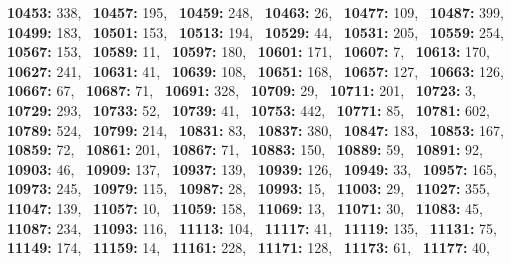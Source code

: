 \textbf{10453:} 338,\allowbreak~ 
\textbf{10457:} 195,\allowbreak~ 
\textbf{10459:} 248,\allowbreak~ 
\textbf{10463:} 26,\allowbreak~ 
\textbf{10477:} 109,\allowbreak~ 
\textbf{10487:} 399,\allowbreak~ 
\textbf{10499:} 183,\allowbreak~ 
\textbf{10501:} 153,\allowbreak~ 
\textbf{10513:} 194,\allowbreak~ 
\textbf{10529:} 44,\allowbreak~ 
\textbf{10531:} 205,\allowbreak~ 
\textbf{10559:} 254,\allowbreak~ 
\textbf{10567:} 153,\allowbreak~ 
\textbf{10589:} 11,\allowbreak~ 
\textbf{10597:} 180,\allowbreak~ 
\textbf{10601:} 171,\allowbreak~ 
\textbf{10607:} 7,\allowbreak~ 
\textbf{10613:} 170,\allowbreak~ 
\textbf{10627:} 241,\allowbreak~ 
\textbf{10631:} 41,\allowbreak~ 
\textbf{10639:} 108,\allowbreak~ 
\textbf{10651:} 168,\allowbreak~ 
\textbf{10657:} 127,\allowbreak~ 
\textbf{10663:} 126,\allowbreak~ 
\textbf{10667:} 67,\allowbreak~ 
\textbf{10687:} 71,\allowbreak~ 
\textbf{10691:} 328,\allowbreak~ 
\textbf{10709:} 29,\allowbreak~ 
\textbf{10711:} 201,\allowbreak~ 
\textbf{10723:} 3,\allowbreak~ 
\textbf{10729:} 293,\allowbreak~ 
\textbf{10733:} 52,\allowbreak~ 
\textbf{10739:} 41,\allowbreak~ 
\textbf{10753:} 442,\allowbreak~ 
\textbf{10771:} 85,\allowbreak~ 
\textbf{10781:} 602,\allowbreak~ 
\textbf{10789:} 524,\allowbreak~ 
\textbf{10799:} 214,\allowbreak~ 
\textbf{10831:} 83,\allowbreak~ 
\textbf{10837:} 380,\allowbreak~ 
\textbf{10847:} 183,\allowbreak~ 
\textbf{10853:} 167,\allowbreak~ 
\textbf{10859:} 72,\allowbreak~ 
\textbf{10861:} 201,\allowbreak~ 
\textbf{10867:} 71,\allowbreak~ 
\textbf{10883:} 150,\allowbreak~ 
\textbf{10889:} 59,\allowbreak~ 
\textbf{10891:} 92,\allowbreak~ 
\textbf{10903:} 46,\allowbreak~ 
\textbf{10909:} 137,\allowbreak~ 
\textbf{10937:} 139,\allowbreak~ 
\textbf{10939:} 126,\allowbreak~ 
\textbf{10949:} 33,\allowbreak~ 
\textbf{10957:} 165,\allowbreak~ 
\textbf{10973:} 245,\allowbreak~ 
\textbf{10979:} 115,\allowbreak~ 
\textbf{10987:} 28,\allowbreak~ 
\textbf{10993:} 15,\allowbreak~ 
\textbf{11003:} 29,\allowbreak~ 
\textbf{11027:} 355,\allowbreak~ 
\textbf{11047:} 139,\allowbreak~ 
\textbf{11057:} 10,\allowbreak~ 
\textbf{11059:} 158,\allowbreak~ 
\textbf{11069:} 13,\allowbreak~ 
\textbf{11071:} 30,\allowbreak~ 
\textbf{11083:} 45,\allowbreak~ 
\textbf{11087:} 234,\allowbreak~ 
\textbf{11093:} 116,\allowbreak~ 
\textbf{11113:} 104,\allowbreak~ 
\textbf{11117:} 41,\allowbreak~ 
\textbf{11119:} 135,\allowbreak~ 
\textbf{11131:} 75,\allowbreak~ 
\textbf{11149:} 174,\allowbreak~ 
\textbf{11159:} 14,\allowbreak~ 
\textbf{11161:} 228,\allowbreak~ 
\textbf{11171:} 128,\allowbreak~ 
\textbf{11173:} 61,\allowbreak~ 
\textbf{11177:} 40,\allowbreak~ 
